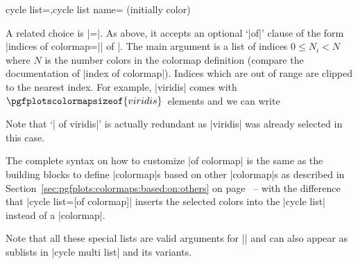 \begin{pgfplotskeylist}{cycle list=,cycle list name= (initially color)}
{    A related choice is |=|. As
    above, it accepts an optional `|of|' clause of the form
    |indices of colormap=|| of |. The main
    argument is a list of indices $0\le N_i < N$ where $N$ is the number colors
    in the colormap definition (compare the documentation of
    |index of colormap|). Indices which are out of range are clipped to the
    nearest index. For example, |viridis| comes with
    $\pgfplotscolormapsizeof{viridis}$~elements and we can write
\begin{codeexample}[]
\end{codeexample}
    Note that `| of viridis|' is actually redundant as |viridis| was already
    selected in this case.

    The complete syntax on how to customize |of colormap| is the same
    as the building blocks to define |colormap|s based on other
    |colormap|s as described in
    Section~\ref{sec:pgfplots:colormaps:based:on:others} on
    page~\pageref{sec:pgfplots:colormaps:based:on:others} -- with the
    difference that |cycle list={[of colormap]}| inserts the selected colors
    into the |cycle list| instead of a |colormap|.

    Note that all these special lists are valid arguments for
    |\pgfplotscreateplotcyclelist| and can also appear as sublists in
    |cycle multi list| and its variants.

}
\end{pgfplotskeylist}
